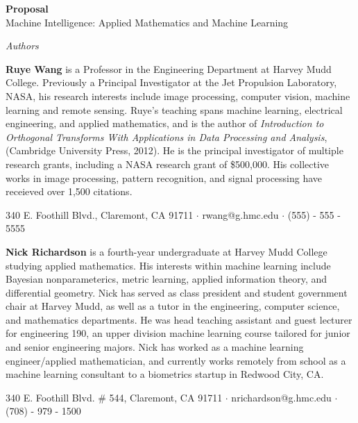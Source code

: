 \documentclass[10pt]{article}
\newenvironment{changemargin}[2]{%
\begin{list}{}{%
\setlength{\topsep}{0pt}%
\setlength{\leftmargin}{#1}%
\setlength{\rightmargin}{#2}%
\setlength{\listparindent}{\parindent}%
\setlength{\itemindent}{\parindent}%
\setlength{\parsep}{\parskip}%
}%
\item[]}{\end{list}}
\begin{document}
\begin{changemargin}{+-1cm}{-3cm}
\noindent
\large{\textbf{Proposal}}\\

\large{Machine Intelligence: Applied Mathematics and Machine Learning}\\
\small

\noindent
\textit{Authors}
\begin{changemargin}{1cm}{0cm}
\textbf{Ruye Wang} is a Professor in the Engineering Department at Harvey Mudd College. Previously a Principal Investigator at the Jet Propulsion Laboratory, NASA, his research interests include image processing, computer vision, machine learning and remote sensing. Ruye's teaching spans machine learning, electrical engineering, and applied mathematics, and is the author of \textit{Introduction to Orthogonal Transforms With Applications in Data Processing and Analysis}, (Cambridge University Press, 2012). He is the principal investigator of multiple research grants, including a NASA research grant of \$500,000. His collective works in image processing, pattern recognition, and signal processing have receieved over 1,500 citations.

\begin{center}
340 E. Foothill Blvd., Claremont, CA 91711 $\cdot$ rwang@g.hmc.edu $\cdot$ (555) - 555 - 5555 \\
\end{center}

\textbf{Nick Richardson} is a fourth-year undergraduate at Harvey Mudd College studying applied mathematics. His interests within machine learning include Bayesian nonparameterics, metric learning, applied information theory, and differential geometry. Nick has served as class president and student government chair at Harvey Mudd, as well as a tutor in the engineering, computer science, and mathematics departments. He was head teaching assistant and guest lecturer for engineering 190, an upper division machine learning course tailored for junior and senior engineering majors. Nick has worked as a machine learning engineer/applied mathematician, and currently works remotely from school as a machine learning consultant to a biometrics startup in Redwood City, CA.

\begin{center}
340 E. Foothill Blvd. \# 544, Claremont, CA 91711 $\cdot$ nrichardson@g.hmc.edu $\cdot$ (708) - 979 - 1500
\end{center}

\end{changemargin}


\end{changemargin}
\end{document}
